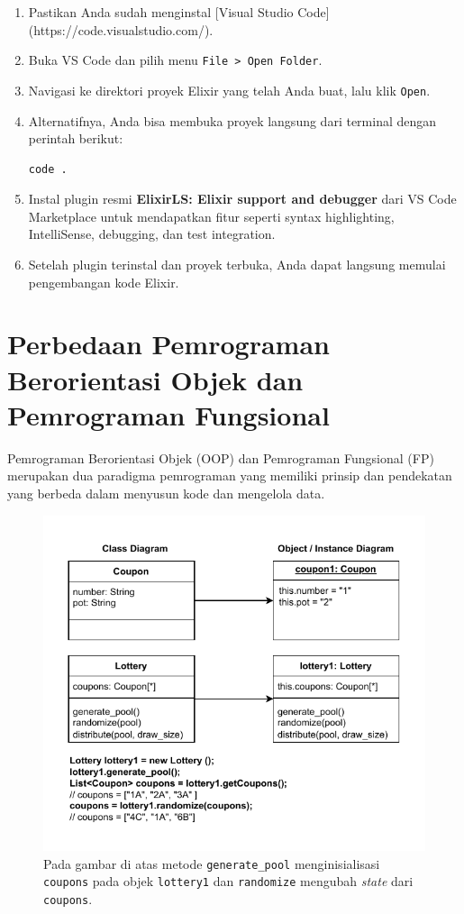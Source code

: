 \begin{enumerate}
	\item Pastikan Anda sudah menginstal [Visual Studio Code](https://code.visualstudio.com/).
	\item Buka VS Code dan pilih menu \texttt{File > Open Folder}.
	\item Navigasi ke direktori proyek Elixir yang telah Anda buat, lalu klik \texttt{Open}.
	\item Alternatifnya, Anda bisa membuka proyek langsung dari terminal dengan perintah berikut:
	\begin{lstlisting}[language=bash]
		code .
	\end{lstlisting}
	\item Instal plugin resmi \textbf{ElixirLS: Elixir support and debugger} dari VS Code Marketplace untuk mendapatkan fitur seperti syntax highlighting, IntelliSense, debugging, dan test integration.
	\item Setelah plugin terinstal dan proyek terbuka, Anda dapat langsung memulai pengembangan kode Elixir.
\end{enumerate}


\section{Perbedaan Pemrograman Berorientasi Objek dan Pemrograman Fungsional}

Pemrograman Berorientasi Objek (OOP) dan Pemrograman Fungsional (FP) merupakan dua paradigma pemrograman yang memiliki prinsip dan pendekatan yang berbeda dalam menyusun kode dan mengelola data.

\begin{figure}[h]
	\centering
	\includegraphics[width=\textwidth]{../assets/object-oriented.pdf}
	\caption{Pada gambar di atas metode \texttt{generate\_pool} menginisialisasi \texttt{coupons} pada objek \texttt{lottery1} dan \texttt{randomize} mengubah \textit{state} dari \texttt{coupons}.}
	\label{fig:ilustrasi-oop}
\end{figure}

